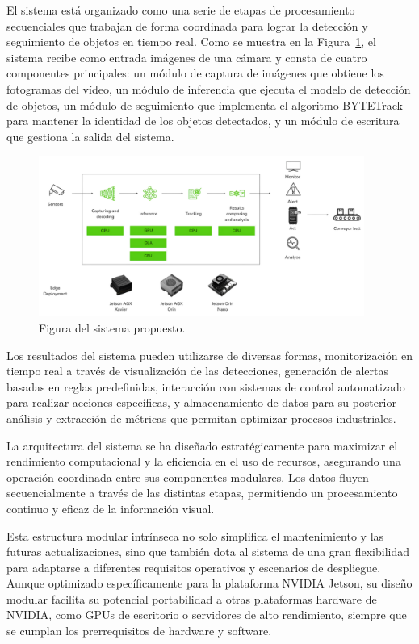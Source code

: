 \documentclass[11pt,spanish,listoffigures,listoftables]{tfgetsinf}
\begin{document}
El sistema está organizado como una serie de etapas de procesamiento secuenciales que trabajan de forma coordinada para lograr la detección y seguimiento de objetos en tiempo real. Como se muestra en la Figura~\ref{fig:sistema_propuesto}, el sistema recibe como entrada imágenes de una cámara y consta de cuatro componentes principales: un módulo de captura de imágenes que obtiene los fotogramas del vídeo, un módulo de inferencia que ejecuta el modelo de detección de objetos, un módulo de seguimiento que implementa el algoritmo BYTETrack para mantener la identidad de los objetos detectados, y un módulo de escritura que gestiona la salida del sistema.
\begin{figure}[H]
   \centering
   \includegraphics[width=0.95\textwidth]{images/diseno_e_implementacion/figura_TFG_v3.png}
   \caption[Figura del sistema propuesto]{Figura del sistema propuesto.}
   \label{fig:sistema_propuesto}
\end{figure}

Los resultados del sistema pueden utilizarse de diversas formas, monitorización en tiempo real a través de visualización de las detecciones, generación de alertas basadas en reglas predefinidas, interacción con sistemas de control automatizado para realizar acciones específicas, y almacenamiento de datos para su posterior análisis y extracción de métricas que permitan optimizar procesos industriales.

La arquitectura del sistema se ha diseñado estratégicamente para maximizar el rendimiento computacional y la eficiencia en el uso de recursos, asegurando una operación coordinada entre sus componentes modulares. Los datos fluyen secuencialmente a través de las distintas etapas, permitiendo un procesamiento continuo y eficaz de la información visual. 

Esta estructura modular intrínseca no solo simplifica el mantenimiento y las futuras actualizaciones, sino que también dota al sistema de una gran flexibilidad para adaptarse a diferentes requisitos operativos y escenarios de despliegue. Aunque optimizado específicamente para la plataforma NVIDIA Jetson, su diseño modular facilita su potencial portabilidad a otras plataformas hardware de NVIDIA, como GPUs de escritorio o servidores de alto rendimiento, siempre que se cumplan los prerrequisitos de hardware y software.
\end{document}
